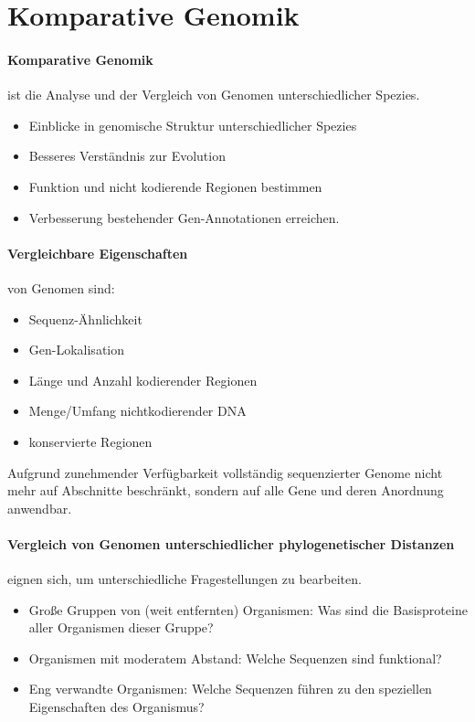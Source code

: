 \section{Komparative Genomik} 
\paragraph{Komparative Genomik} ist die Analyse und der Vergleich von Genomen unterschiedlicher Spezies.
\begin{itemize}
    \item Einblicke in genomische Struktur unterschiedlicher Spezies
    \item Besseres Verständnis zur Evolution
    \item Funktion und nicht kodierende Regionen bestimmen
    \item Verbesserung bestehender Gen-Annotationen erreichen.
\end{itemize}
\paragraph{Vergleichbare Eigenschaften} von Genomen sind:
\begin{itemize}
    \item Sequenz-Ähnlichkeit
    \item Gen-Lokalisation
    \item Länge und Anzahl kodierender Regionen
    \item Menge/Umfang nichtkodierender DNA
    \item konservierte Regionen
\end{itemize}
Aufgrund zunehmender Verfügbarkeit vollständig sequenzierter Genome nicht mehr auf Abschnitte beschränkt, sondern auf alle Gene und deren Anordnung anwendbar.

\paragraph{Vergleich von Genomen unterschiedlicher phylogenetischer Distanzen} eignen sich, um unterschiedliche Fragestellungen zu bearbeiten. 
\begin{itemize}
    \item Große Gruppen von (weit entfernten) Organismen: Was sind die Basisproteine aller Organismen dieser Gruppe? 
    \item Organismen mit moderatem Abstand: Welche Sequenzen sind funktional? 
    \item Eng verwandte Organismen: Welche Sequenzen führen zu den speziellen Eigenschaften des Organismus?
\end{itemize}


